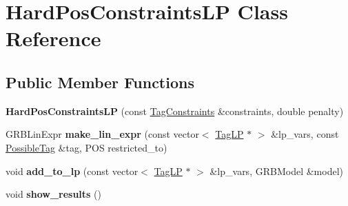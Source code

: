 \hypertarget{class_hard_pos_constraints_l_p}{
\section{HardPosConstraintsLP Class Reference}
\label{class_hard_pos_constraints_l_p}
}
\subsection*{Public Member Functions}
\begin{DoxyCompactItemize}
\item 
\hypertarget{class_hard_pos_constraints_l_p_a2979e37eb163b00f48a38ee8fccd1a64}{
{\bfseries HardPosConstraintsLP} (const \hyperlink{class_tag_constraints}{TagConstraints} \&constraints, double penalty)}
\label{class_hard_pos_constraints_l_p_a2979e37eb163b00f48a38ee8fccd1a64}

\item 
\hypertarget{class_hard_pos_constraints_l_p_aa841ffcec001c0ee31714d0d39027c26}{
GRBLinExpr {\bfseries make\_\-lin\_\-expr} (const vector$<$ \hyperlink{struct_scarab_1_1_h_g_1_1_tag_l_p}{TagLP} $\ast$ $>$ \&lp\_\-vars, const \hyperlink{struct_possible_tag}{PossibleTag} \&tag, POS restricted\_\-to)}
\label{class_hard_pos_constraints_l_p_aa841ffcec001c0ee31714d0d39027c26}

\item 
\hypertarget{class_hard_pos_constraints_l_p_a7a7bb0c41351c9de3130045f0013c67b}{
void {\bfseries add\_\-to\_\-lp} (const vector$<$ \hyperlink{struct_scarab_1_1_h_g_1_1_tag_l_p}{TagLP} $\ast$ $>$ \&lp\_\-vars, GRBModel \&model)}
\label{class_hard_pos_constraints_l_p_a7a7bb0c41351c9de3130045f0013c67b}

\item 
\hypertarget{class_hard_pos_constraints_l_p_a4307bcde1a701018736de348a718262b}{
void {\bfseries show\_\-results} ()}
\label{class_hard_pos_constraints_l_p_a4307bcde1a701018736de348a718262b}

\end{DoxyCompactItemize}
